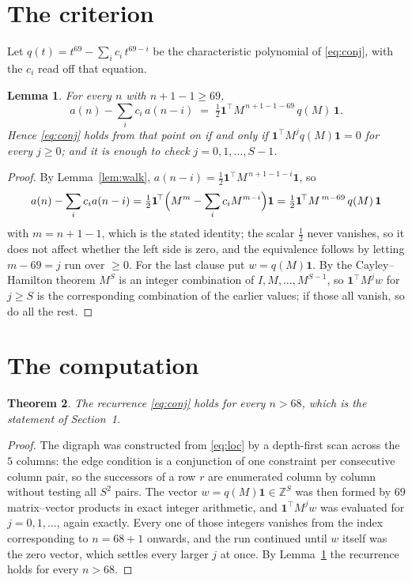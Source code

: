\documentclass[11pt,a4paper]{article}
\theoremstyle{plain}
\newtheorem{theorem}{Theorem}
\newtheorem{lemma}[theorem]{Lemma}
\theoremstyle{definition}
\begin{document}
\section{The criterion}

Let $q(t)=t^{69}-\sum_i c_i\,t^{69-i}$ be the characteristic polynomial of
\eqref{eq:conj}, with the $c_i$ read off that equation.

\begin{lemma}\label{lem:crit}
For every $n$ with $n+1-1\ge69$,
\[
a(n)-\sum_i c_i\,a(n-i)\;=\;\tfrac1{2}\mathbf{1}^{\!\top}M^{\,n+1-1-69}\,q(M)\,\mathbf{1} .
\]
Hence \eqref{eq:conj} holds from that point on if and only if
$\mathbf{1}^{\!\top}M^{j}q(M)\mathbf{1}=0$ for every $j\ge0$; and it is enough to check
$j=0,1,\dots,S-1$.
\end{lemma}

\begin{proof}
By Lemma~\ref{lem:walk}, $a(n-i)=\tfrac1{2}\mathbf{1}^{\!\top}M^{\,n+1-1-i}\mathbf{1}$, so
\[
a(n)-\sum_i c_i a(n-i)
=\tfrac1{2}\mathbf{1}^{\!\top}\Bigl(M^{m}-\sum_i c_i M^{m-i}\Bigr)\mathbf{1}
=\tfrac1{2}\mathbf{1}^{\!\top}M^{\,m-69}\,q(M)\,\mathbf{1}
\]
with $m=n+1-1$, which is the stated identity; the scalar $\tfrac1{2}$ never vanishes, so it does not affect whether the left side is zero, and the equivalence follows by letting
$m-69=j$ run over $\ge0$. For the last clause put $w=q(M)\mathbf{1}$. By the
Cayley--Hamilton theorem $M^{S}$ is an integer combination of $I,M,\dots,M^{S-1}$, so
$\mathbf{1}^{\!\top}M^{j}w$ for $j\ge S$ is the corresponding combination of the earlier
values; if those all vanish, so do all the rest.
\end{proof}

\section{The computation}

\begin{theorem}
The recurrence \eqref{eq:conj} holds for every $n>68$, which is the statement of
Section~1.
\end{theorem}

\begin{proof}
The digraph was constructed from \eqref{eq:loc} by a depth-first scan across the $5$
columns: the edge condition is a conjunction of one constraint per consecutive column
pair, so the successors of a row $r$ are enumerated column by column without testing all
$S^2$ pairs. The vector $w=q(M)\mathbf{1}\in\mathbb{Z}^{S}$ was then formed by $69$
matrix--vector products in exact integer arithmetic, and $\mathbf{1}^{\!\top}M^{j}w$ was
evaluated for $j=0,1,\dots$, again exactly. Every one of those integers vanishes from the
index corresponding to $n=68+1$ onwards, and the run continued until $w$ itself was the
zero vector, which settles every larger $j$ at once. By Lemma~\ref{lem:crit} the recurrence
holds for every $n>68$.
\end{proof}
\end{document}
